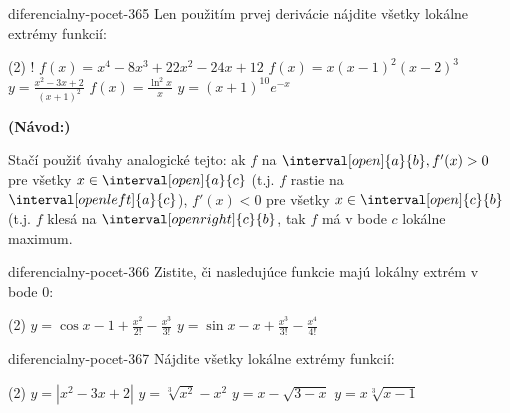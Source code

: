 \begin{defproblem}{diferencialny-pocet-365}
Len použitím prvej derivácie nájdite všetky lokálne extrémy funkcií:
\begin{tasks}(2)
  \task! $f(x)=x^4-8x^3+22x^2-24x+12$
  \task $f(x)=x(x-1)^2(x-2)^3$
  \task $y=\frac{x^2-3x+2}{(x+1)^2}$
  \task $f(x)=\frac{\ln^2 x}{x}$
  \task $y=(x+1)^{10}e^{-x}$
\end{tasks}

\begin{solution}
  \textbf{(Návod:)}

  Stačí použiť úvahy analogické tejto: ak $f$ na $\interval[open]{a}{b},f'(x)>0$
  pre všetky $x\in \interval[open]{a}{c}$ (t.j. $f$ rastie na $\interval[open
  left]{a}{c}$), $f'(x)<0$ pre všetky $x\in \interval[open]{c}{b}$ (t.j. $f$
  klesá na $\interval[open right]{c}{b}$, tak $f$ má v bode $c$ lokálne
  maximum.
\end{solution}
\end{defproblem}

\begin{defproblem}{diferencialny-pocet-366}
Zistite, či nasledujúce funkcie majú lokálny extrém v bode $0$:
\begin{tasks}(2)
  \task $y=\cos x-1+\frac{x^2}{2!}-\frac{x^3}{3!}$
  \task $y=\sin x-x+\frac{x^3}{3!}-\frac{x^4}{4!}$
\end{tasks}
\end{defproblem}

\begin{defproblem}{diferencialny-pocet-367}
Nájdite všetky lokálne extrémy funkcií:
\begin{tasks}(2)
  \task $y=|x^2-3x+2|$
  \task $y=\sqrt[3]{x^2}-x^2$
  \task $y=x-\sqrt{3-x}$
  \task $y=x\sqrt[3]{x-1}$
\end{tasks}
\end{defproblem}

